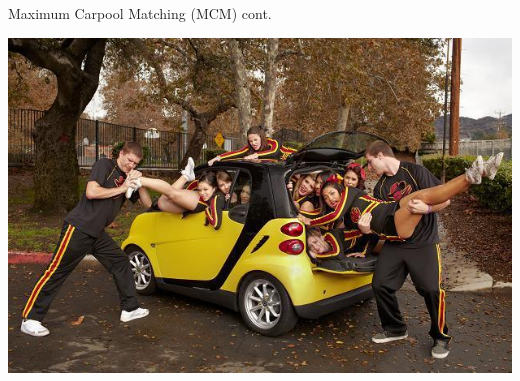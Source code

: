 \begin{frame}{Maximum Carpool Matching (MCM) cont.}
\begin{center}
\includegraphics[scale=.5]{capacity}
\end{center}
\end{frame}
